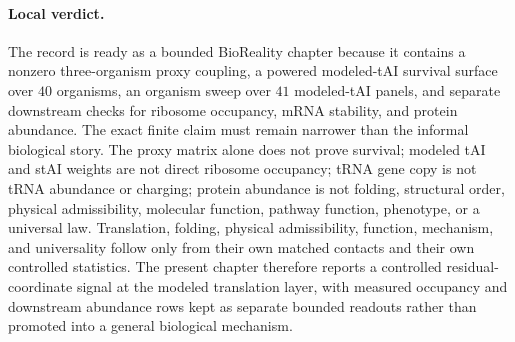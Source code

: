 \paragraph{Local verdict.}
The record is ready as a bounded BioReality chapter because it contains a nonzero three-organism proxy coupling, a powered modeled-tAI survival surface over $40$ organisms, an organism sweep over $41$ modeled-tAI panels, and separate downstream checks for ribosome occupancy, mRNA stability, and protein abundance.  The exact finite claim must remain narrower than the informal biological story.  The proxy matrix alone does not prove survival; modeled tAI and stAI weights are not direct ribosome occupancy; tRNA gene copy is not tRNA abundance or charging; protein abundance is not folding, structural order, physical admissibility, molecular function, pathway function, phenotype, or a universal law.  Translation, folding, physical admissibility, function, mechanism, and universality follow only from their own matched contacts and their own controlled statistics.  The present chapter therefore reports a controlled residual-coordinate signal at the modeled translation layer, with measured occupancy and downstream abundance rows kept as separate bounded readouts rather than promoted into a general biological mechanism.